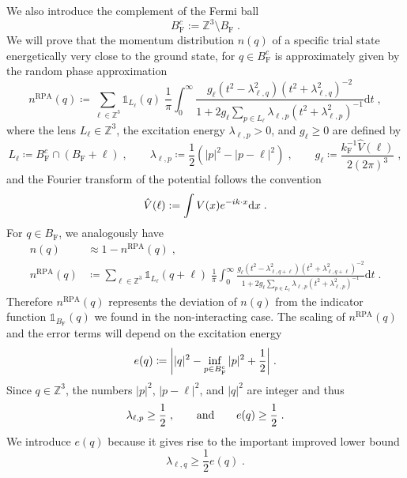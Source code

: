 \documentclass[12pt,a4paper]{article}
\numberwithin{equation}{section}
\newcommand{\Zbb}{\mathbb{Z}}
\newcommand{\1}{\mathbb{I}}
\newcommand{\di}{\textnormal{d}}
\newcommand{\F}{\mathrm{F}}
\newcommand{\RPA}{\mathrm{RPA}}
\newcommand{\kF}{k_\F}
\newcommand{\Zstar}{\mathbb{Z}^3} %
\newcommand{\Z}{\mathbb{Z}}
\newcommand{\half}{\frac{1}{2}}
\theoremstyle{plain}
\theoremstyle{definition}
\theoremstyle{remark}
\theoremstyle{plain}
\theoremstyle{definition}
\theoremstyle{remark}
\begin{document}
We also introduce the complement of the Fermi ball
\begin{equation}
   B_\text{F}^c := \Zbb^3 \setminus B_\text{F} \;.
\end{equation}
%
We will prove that the momentum distribution $ n(q) $ of a specific trial state energetically very close to the ground state, for $ q \in B_{\F}^c $ is approximately given by the random phase approximation
\begin{equation} \label{eq:nqb}
	n^{\RPA}(q)
	\coloneq \sum_{\ell \in \Zstar}\mathds{1}_{L_{\ell}}(q) \; \frac{1}{\pi}\int_0^\infty \frac{g_\ell (t^2-\lambda^2_{\ell,q}) (t^2 + \lambda^2_{\ell,q})^{-2}}{1 + 2g_\ell \sum_{p \in L_{\ell}}\lambda_{\ell,p} (t^2+\lambda^2_{\ell,p})^{-1}} \mathrm{d}t \;,
\end{equation}
where the lens $ L_\ell \in \Z^3 $, the excitation energy $ \lambda_{\ell,p} > 0 $, and $ g_\ell \ge 0 $ are defined by
\begin{equation} \label{eq:Lell}
	L_\ell \coloneq B_{\F}^c \cap (B_{\F} + \ell) \;, \qquad
	\lambda_{\ell,p} \coloneq \half (|p|^2 - |p-\ell|^2) \;, \qquad
	g_\ell \coloneq \frac{\kF^{-1} \hat{V}(\ell) }{2 (2 \pi)^3} \;,
\end{equation}
and the Fourier transform of the potential follows the convention
\begin{equation} \label{eq:Fourierconvention}
	\hat{V}(\ell) := \int V(x) e^{-i k \cdot x} \di x \;.
\end{equation}
For $ q \in B_{\F} $, we analogously have
\begin{equation}\label{eq:inside}
\begin{split}
	n(q) & \approx 1 - n^{\RPA}(q) \;, \\
	n^{\RPA}(q) & 	\coloneq \sum_{\ell \in \Zstar}\mathds{1}_{L_{\ell}}(q+\ell) \; \frac{1}{\pi}\int_0^\infty \frac{g_\ell (t^2-\lambda^2_{\ell,q+\ell}) (t^2 + \lambda^2_{\ell,q+\ell})^{-2}}{1 + 2g_\ell \sum_{p \in L_{\ell}}\lambda_{\ell,p} (t^2+\lambda^2_{\ell,p})^{-1}} \mathrm{d}t \;.
\end{split}
\end{equation}
Therefore $ n^{\RPA}(q) $ represents the deviation of $ n(q) $ from the indicator function $ \mathds{1}_{B_{\F}}(q) $ we found in the non-interacting case. The scaling of $ n^{\RPA}(q) $ and the error terms will depend on the excitation energy
\begin{equation} \label{eq:eq}
	e(q) \coloneq \abs{|q|^2 - \inf_{p \in B_{\F}^c} |p|^2 + \half} \;.
\end{equation}
Since $ q \in \Z^3 $, the numbers $|p|^2$, $|p-\ell|^2$, and $|q|^2 $ are integer and thus
\begin{equation}
	\lambda_{\ell,p} \geq \half \;, \qquad \textnormal{and} \qquad e(q) \ge \half \;.
\end{equation}
We introduce $ e(q) $ because it gives rise to the important improved lower bound
\begin{equation}
   \lambda_{\ell,q} \ge \half e(q) \;.
\end{equation}
\end{document}

